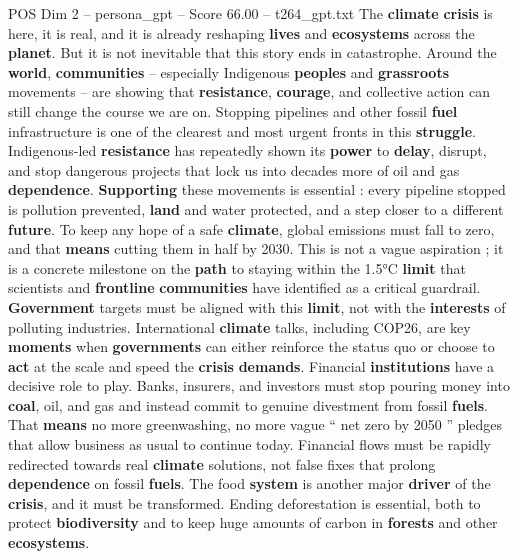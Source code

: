 \begin{textsample}{POS Dim 2 – persona\_gpt – Score 66.00 – t264\_gpt.txt}  \label{ex:f2_pos_004}
The \textbf{climate} \textbf{crisis} is here, it is real, and it is already reshaping \textbf{lives} and \textbf{ecosystems} across the \textbf{planet}.
But it is not inevitable that this story ends in catastrophe.
Around the \textbf{world}, \textbf{communities} – especially Indigenous \textbf{peoples} and \textbf{grassroots} movements – are showing that \textbf{resistance}, \textbf{courage}, and collective action can still change the course we are on.
Stopping pipelines and other fossil \textbf{fuel} infrastructure is one of the clearest and most urgent fronts in this \textbf{struggle}.
Indigenous-led \textbf{resistance} has repeatedly shown its \textbf{power} to \textbf{delay}, disrupt, and stop dangerous projects that lock us into decades more of oil and gas \textbf{dependence}. \textbf{Supporting} these movements is essential : every pipeline stopped is pollution prevented, \textbf{land} and water protected, and a step closer to a different \textbf{future}.
To keep any hope of a safe \textbf{climate}, global emissions must fall to zero, and that \textbf{means} cutting them in half by 2030.
This is not a vague aspiration ; it is a concrete milestone on the \textbf{path} to staying within the 1.5°C \textbf{limit} that scientists and \textbf{frontline} \textbf{communities} have identified as a critical guardrail. \textbf{Government} targets must be aligned with this \textbf{limit}, not with the \textbf{interests} of polluting industries.
International \textbf{climate} talks, including COP26, are key \textbf{moments} when \textbf{governments} can either reinforce the status quo or choose to \textbf{act} at the scale and speed the \textbf{crisis} \textbf{demands}.
Financial \textbf{institutions} have a decisive role to play.
Banks, insurers, and investors must stop pouring money into \textbf{coal}, oil, and gas and instead commit to genuine divestment from fossil \textbf{fuels}.
That \textbf{means} no more greenwashing, no more vague “ net zero by 2050 ” pledges that allow business as usual to continue today.
Financial flows must be rapidly redirected towards real \textbf{climate} solutions, not false fixes that prolong \textbf{dependence} on fossil \textbf{fuels}.
The food \textbf{system} is another major \textbf{driver} of the \textbf{crisis}, and it must be transformed.
Ending deforestation is essential, both to protect \textbf{biodiversity} and to keep huge amounts of carbon in \textbf{forests} and other \textbf{ecosystems}.

\end{textsample}
